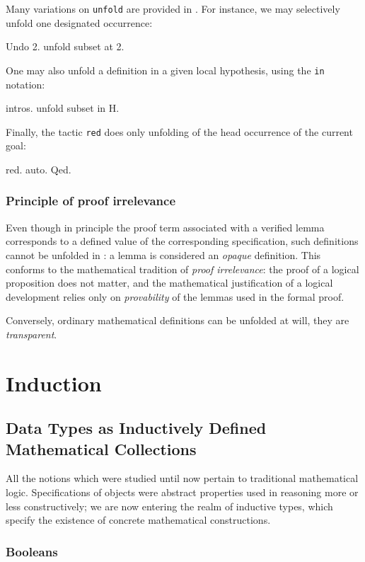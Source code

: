\documentclass[11pt,a4paper]{book}
\begin{document}
Many variations on \verb:unfold: are provided in \Coq. For instance,
we may selectively unfold one designated occurrence:
\begin{coq_example}
Undo 2.
unfold subset at 2.
\end{coq_example}

One may also unfold a definition in a given local hypothesis, using the
\verb:in: notation:
\begin{coq_example}
intros.
unfold subset in H.
\end{coq_example}

Finally, the tactic \verb:red: does only unfolding of the head occurrence
of the current goal:
\begin{coq_example}
red.
auto.
Qed.
\end{coq_example}


\subsection{Principle of proof irrelevance}

Even though in principle the proof term associated with a verified lemma
corresponds to a defined value of the corresponding specification, such
definitions cannot be unfolded in \Coq: a lemma is considered an {\sl opaque}
definition. This conforms to the mathematical tradition of {\sl proof
irrelevance}: the proof of a logical proposition does not matter, and the
mathematical justification of a logical development relies only on
{\sl provability} of the lemmas used in the formal proof. 

Conversely, ordinary mathematical definitions can be unfolded at will, they
are {\sl transparent}. 
\chapter{Induction}

\section{Data Types as Inductively Defined Mathematical Collections}

All the notions which were studied until now pertain to traditional
mathematical logic. Specifications of objects were abstract properties
used in reasoning more or less constructively; we are now entering
the realm of inductive types, which specify the existence of concrete
mathematical constructions.

\subsection{Booleans}
\end{document}
